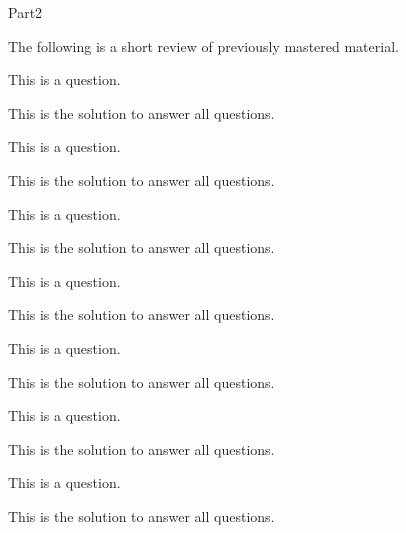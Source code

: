 \documentclass[10pt]{article}
\begin{document}
\begin{exam}[Part II.]{Part2}

\begin{instructions}[Part II.]
The following is a short review of previously mastered material.
\end{instructions}

\begin{problem}[5]
This is a question.
\begin{solution}[.5in]
This is the solution to answer all questions.
\end{solution}
\end{problem}

\begin{problem}[7]
This is a question.
\begin{solution}[.5in]
This is the solution to answer all questions.
\end{solution}
\end{problem}

\begin{problem}[8]
This is a question.
\begin{solution}[1in]
This is the solution to answer all questions.
\end{solution}
\end{problem}

\begin{problem}[5]
This is a question.
\begin{solution}[1in]
This is the solution to answer all questions.
\end{solution}
\end{problem}

\begin{problem}[10]
This is a question.
\begin{solution}[1in]
This is the solution to answer all questions.
\end{solution}
\end{problem}

\begin{problem}[5]
This is a question.
\begin{solution}[1in]
This is the solution to answer all questions.
\end{solution}
\end{problem}

\begin{problem}[10]
This is a question.
\begin{solution}[1in]
This is the solution to answer all questions.
\end{solution}
\end{problem}
\end{exam}
\end{document}
